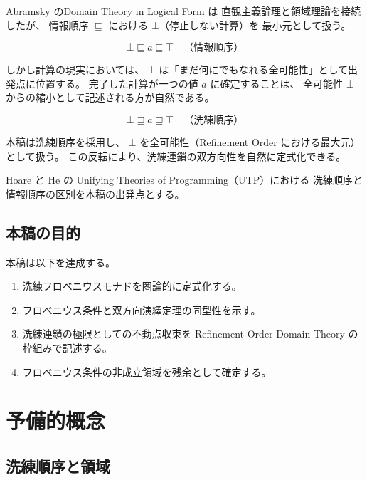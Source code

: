 \documentclass[11pt,a4paper]{article}
\theoremstyle{definition}
\begin{document}
Abramsky \cite{Abramsky1991} のDomain Theory in Logical Form は
直観主義論理と領域理論を接続したが、
情報順序 $\sqsubseteq$ における $\bot$（停止しない計算）を
最小元として扱う。

\begin{equation}
\bot \sqsubseteq a \sqsubseteq \top \quad \text{（情報順序）}
\end{equation}

しかし計算の現実においては、
$\bot$ は「まだ何にでもなれる全可能性」として出発点に位置する。
完了した計算が一つの値 $a$ に確定することは、
全可能性 $\bot$ からの縮小として記述される方が自然である。

\begin{equation}
\bot \sqsupseteq a \sqsupseteq \top \quad \text{（洗練順序）}
\end{equation}

本稿は洗練順序を採用し、
$\bot$ を全可能性（Refinement Order における最大元）として扱う。
この反転により、洗練連鎖の双方向性を自然に定式化できる。

Hoare と He \cite{Hoare1998} の
Unifying Theories of Programming（UTP）における
洗練順序と情報順序の区別を本稿の出発点とする。

\subsection{本稿の目的}

本稿は以下を達成する。

\begin{enumerate}
\item 洗練フロベニウスモナドを圏論的に定式化する。
\item フロベニウス条件と双方向演繹定理の同型性を示す。
\item 洗練連鎖の極限としての不動点収束を
  Refinement Order Domain Theory の枠組みで記述する。
\item フロベニウス条件の非成立領域を残余として確定する。
\end{enumerate}

\section{予備的概念}

\subsection{洗練順序と領域}
\end{document}
